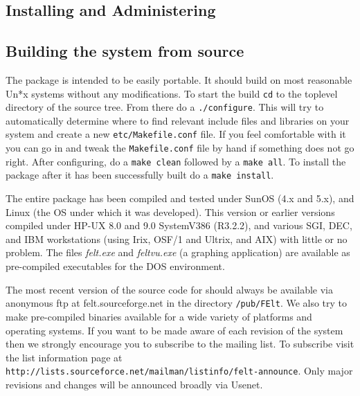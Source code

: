 
\begin{appendix}

\newpage{\pagestyle{empty}\cleardoublepage}

\chapter{Installing and Administering \felt{}}
\label{appendix.install}

\section{Building the \felt{} system from source}

The \felt{} package is intended to be easily portable.  It should build on most 
reasonable Un*x systems without any modifications.  To start the build 
{\tt cd} to the toplevel directory of the \felt{} source tree.  From there 
do a {\tt ./configure}.
This will try to automatically determine where to find relevant include files
and libraries on your system and create a new {\tt etc/Makefile.conf} file.  
If you feel comfortable with it you can go in and tweak 
the {\tt Makefile.conf} file by hand if something does not go right.  
After configuring, do a {\tt make clean} followed by a 
{\tt make all}.  To install the package after it has been successfully 
built do a {\tt make install}.	

The entire package has been compiled and tested under SunOS (4.x and 5.x), 
and Linux (the OS under which it was developed).  This version or earlier 
versions
compiled under HP-UX 8.0 and 9.0 SystemV386 (R3.2.2), and various SGI, DEC, 
and IBM workstations (using Irix, OSF/1 and Ultrix, and AIX) with little or
no problem.  
The files {\em felt.exe} and {\em feltvu.exe} (a graphing application) 
are available as pre-compiled executables for the DOS environment.  	

The most recent version of the source code for \felt{} should always be 
available via anonymous ftp at felt.sourceforge.net in the directory 
{\tt /pub/FElt}.  We also try to make 
pre-compiled binaries available for a wide variety of platforms and operating
systems.  If you want to be made aware of each revision of the \felt{} system 
then we strongly encourage you to subscribe to the \felt{} mailing list.  
To subscribe visit the list information page at 
\mbox{\tt http://lists.sourceforce.net/mailman/listinfo/felt-announce}.
Only major revisions and changes will be announced broadly via Usenet.


\end{appendix}
